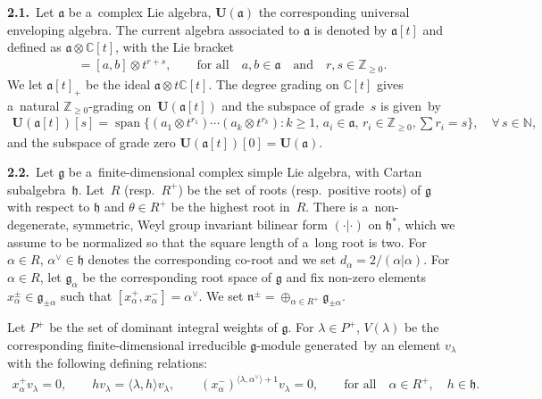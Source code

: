 \documentclass[pdftex]{sigma}
\DeclareMathOperator{\spn}{span}
\numberwithin{equation}{section}
\begin{document}
{\bf 2.1.}~Let $\mathfrak{a}$ be a~complex Lie algebra, $\mathbf{U}(\mathfrak{a})$ the corresponding universal
enveloping algebra.
The current algebra associated to $\mathfrak{a}$ is denoted by $\mathfrak{a}[t]$ and def\/ined as $\mathfrak{a} \otimes
\mathbb{C}[t]$, with the Lie bracket
\begin{gather*}
[a \otimes t^r, b \otimes t^s]=[a, b]\otimes t^{r+s},
\qquad
\text{for all}
\quad
a, b \in \mathfrak{a}
\quad
\text{and}
\quad
r, s \in \mathbb{Z}_{\geq 0}.
\end{gather*}
We let $\mathfrak{a}[t]_{+}$ be the ideal $\mathfrak{a}\otimes t\mathbb{C}[t]$. The degree grading on $\mathbb{C}[t]$
gives a~natural $\mathbb{Z}_{\geq 0}$-grading on~$\mathbf{U}(\mathfrak{a}[t])$ and the subspace of grade~$s$ is given~by
\begin{gather*}
\mathbf{U}(\mathfrak{a}[t])[s]= \spn \Big\{(a_1\otimes t^{r_1})\cdots (a_k\otimes t^{r_k}):k\geq 1,\,
a_i\in\mathfrak{a},\, r_i\in \mathbb{Z}_{\geq 0}, \sum r_i=s\Big\},
\quad
\forall\, s\in \mathbb{N},
\end{gather*}
and the subspace of grade zero $\mathbf{U}(\mathfrak{a}[t])[0]=\mathbf{U}(\mathfrak{a})$.

{\bf 2.2.}~Let $\mathfrak{g}$ be a~f\/inite-dimensional complex simple Lie algebra, with Cartan subalgebra~$\mathfrak{h}$.
Let~$R$ (resp.~$R^+$) be the set of roots (resp.\
positive roots) of $\mathfrak{g}$ with respect to $\mathfrak{h}$ and $\theta \in R^+$ be the highest root in~$R$.
There is a~non-degenerate, symmetric, Weyl group invariant bilinear form $(\cdot|\cdot)$ on $\mathfrak{h}^*$, which we assume to
be normalized so that the square length of a~long root is two.
For $\alpha\in R$, $\alpha^{\vee}\in\mathfrak{h}$ denotes the corresponding co-root and we set
$d_{\alpha}=2/(\alpha|\alpha)$. For $\alpha\in R$, let $\mathfrak{g}_{\alpha}$ be the corresponding root space of
$\mathfrak{g}$ and f\/ix non-zero elements $x^{\pm}_{\alpha}\in \mathfrak{g}_{\pm\alpha}$ such that $[x^{+}_{\alpha},x^{-}_{\alpha}]=\alpha^{\vee}$.
We set $\mathfrak{n}^{\pm}=\oplus_{\alpha\in R^{+}}  \mathfrak{g}_{\pm\alpha}$.

Let $P^{+}$ be the set of dominant integral weights of $\mathfrak{g}$.
For $\lambda\in P^+$, $V(\lambda)$ be the corresponding f\/inite-dimensional irreducible $\mathfrak{g}$-module generated~by
an element $v_{\lambda}$ with the following def\/ining relations:
\begin{gather*}
x^{+}_{\alpha}v_\lambda=0,
\qquad
h v_\lambda = \langle \lambda, h \rangle v_\lambda,
\qquad
(x^{-}_{\alpha})^{\langle \lambda, \alpha^{\vee} \rangle +1}  v_\lambda=0,
\qquad
\text{for all}
\quad
\alpha\in R^+,
\quad
h\in\mathfrak{h}.
\end{gather*}
\end{document}
